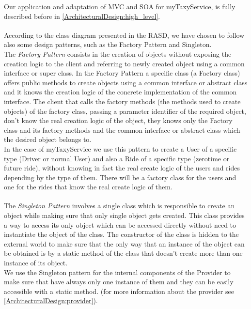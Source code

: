 \documentclass[\mainpath/main]{subfiles}
\begin{document}
Our application and adaptation of MVC and SOA for myTaxyService, is fully described before in \autoref{ArchitecturalDesign:high_level}.\\
\\
According to the class diagram presented in the RASD, we have chosen to follow also some design patterns, such as the Factory Pattern and Singleton.\\
The \textit{Factory Pattern} consists in the creation of objects without exposing the creation logic to the client and referring to newly created object using a common interface or super class. In the Factory Pattern a specific class (a Factory class) offers public methods to create objects using a common interface or abstract class and it knows the creation logic of the concrete implementation of the common interface. The client that calls the factory methods (the methods used to create objects) of the factory class, passing a parameter identifier of the required object, don't know the real creation logic of the object, they knows only the Factory class and its factory methods and the common interface or abstract class which the desired object belongs to.\\
In the case of myTaxyService we use this pattern to create a User of a specific type (Driver or normal User) and also a Ride of a specific type (zerotime or future ride), without knowing in fact the real create logic of the users and rides depending by the type of them. There will be a factory class for the users and one for the rides that know the real create logic of them.\\
\\
The \textit{Singleton Pattern} involves a single class which is responsible to create an object while making sure that only single object gets created. This class provides a way to access its only object which can be accessed directly without need to instantiate the object of the class. The constructor of the class is hidden to the external world to make sure that the only way that an instance of the object can be obtained is by a static method of the class that doesn't create more than one instance of its object.\\
We use the Singleton pattern for the internal components of the Provider to make sure that have always only one instance of them and they can be easily accessible with a static method. (for more information about the provider see \autoref{ArchitecturalDesign:provider}).

\end{document}
